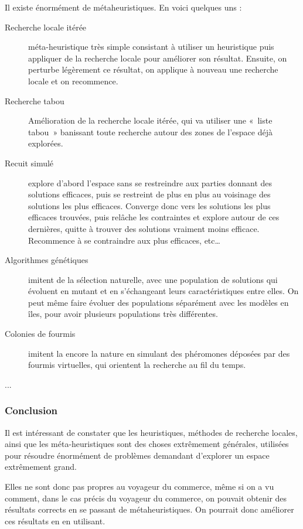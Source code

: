   Il existe énormément de métaheuristiques. En voici quelques uns :
  \begin{description}
  \item[Recherche locale itérée] méta-heuristique très simple consistant à utiliser un heuristique
                                 puis appliquer de la recherche locale pour améliorer son résultat.
                                 Ensuite, on perturbe légèrement ce résultat, on applique à nouveau
                                 une recherche locale et on recommence.
  \item[Recherche tabou] Amélioration de la recherche locale itérée, qui va utiliser une «~liste tabou~»
                         banissant toute recherche autour des zones de l'espace déjà explorées.
  \item[Recuit simulé] explore d'abord l'espace sans se restreindre aux parties donnant des solutions
                       efficaces, puis se restreint de plus en plus au voisinage des solutions les
                       plus efficaces. Converge donc vers les solutions les plus efficaces trouvées,
                       puis relâche les contraintes et explore autour de ces dernières, quitte à
                       trouver des solutions vraiment moins efficace. Recommence à se contraindre
                       aux plus efficaces, etc…
  \item[Algorithmes génétiques] imitent de la sélection naturelle, avec une population de solutions
                                qui évoluent en mutant et en s'échangeant leurs caractéristiques
                                entre elles. On peut même faire évoluer des populations séparément
                                avec les modèles en îles, pour avoir plusieurs populations très
                                différentes.
  \item[Colonies de fourmis] imitent la encore la nature en simulant des phéromones déposées par des
                             fourmis virtuelles, qui orientent la recherche au fil du temps.
  \item[...]
  \end{description}

  \subsubsection{Conclusion}

  Il est intéressant de constater que les heuristiques, méthodes de recherche locales,
  ainsi que les méta-heuristiques sont des choses extrêmement générales, utilisées
  pour résoudre énormément de problèmes demandant d'explorer un espace extrêmement grand.

  Elles ne sont donc pas propres au voyageur du commerce, même si on a vu comment, dans
  le cas précis du voyageur du commerce, on pouvait obtenir des résultats corrects en se
  passant de métaheuristiques. On pourrait donc améliorer ces résultats en en utilisant.
